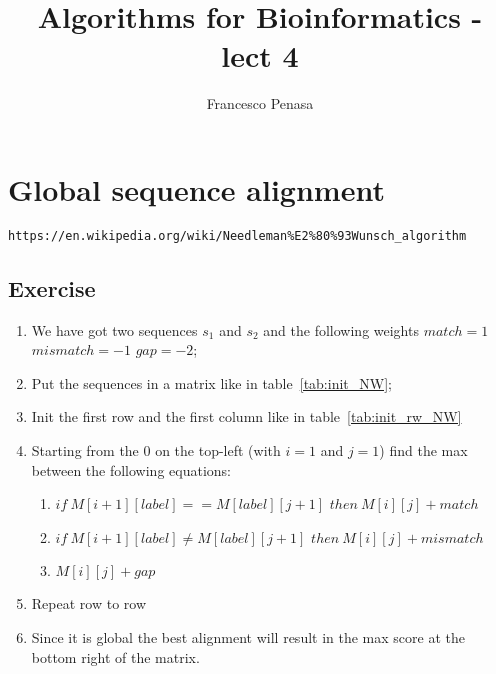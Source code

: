 \documentclass[11pt]{article}
\begin{document}
\author{Francesco Penasa}
\title{Algorithms for Bioinformatics - lect 4}
\maketitle

\medskip

\section{Global sequence alignment} %
\label{sec:global_sequence_alignment}
\texttt{https://en.wikipedia.org/wiki/Needleman\%E2\%80\%93Wunsch\_algorithm}
\subsection{Exercise} %
\label{sub:exercise}
\begin{enumerate}
	\item We have got two sequences $s_1$ and $s_2$ and the following weights $match = 1$ $mismatch = -1$ $gap = -2$;
	\item Put the sequences in a matrix like in table~\ref{tab:init_NW};
	\item Init the first row and the first column like in table~\ref{tab:init_rw_NW}
	\item Starting from the $0$ on the top-left (with $i=1$ and $j=1$) find the max between the following equations: 
	\begin{enumerate}
	 	\item $if\  M[i+1][label] == M[label][j+1]$ $then\ M[i][j] + match$
	 	\item $if\  M[i+1][label] \neq M[label][j+1]$ $then\ M[i][j] + mismatch$
	 	\item $M[i][j] + gap$
 	\end{enumerate} 
 	\item Repeat row to row
 	\item Since it is global the best alignment will result in the max score at the bottom right of the matrix.
\end{enumerate}
\end{document}
